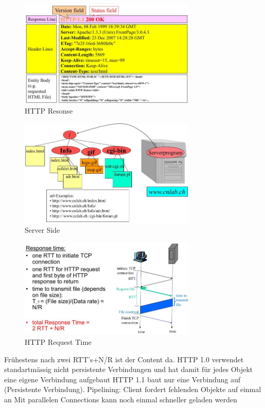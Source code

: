 \documentclass[ngerman,a4paper,12pt]{scrreprt}
\begin{document}
\begin{figure}[H]
	\centering
	\includegraphics[width=0.75\textwidth]{img/V14.10.jpg}
	\caption{HTTP Resonse}
	\label{}
\end{figure}

\begin{figure}[H]
	\centering
	\includegraphics[width=0.75\textwidth]{img/V14.9.jpg}
	\caption{Server Side}
	\label{}
\end{figure}


\begin{figure}[H]
	\centering
	\includegraphics[width=0.75\textwidth]{img/V14.11.jpg}
	\caption{HTTP Request Time}
	\label{}
\end{figure}

\ul
	\li Frühestens nach zwei RTT's+N/R ist der Content da.
	\li HTTP 1.0 verwendet standartmässig nicht persistente Verbindungen und hat damit für jedes Objekt eine eigene Verbindung aufgebaut
	\li HTTP 1.1 baut nur eine Verbindung auf (Persistente Verbindung).
	\li Pipelining: Client fordert fehlenden Objekte auf einmal an
	\li Mit parallelen Connections kann noch einmal schneller geladen werden
\ulE
\end{document}
